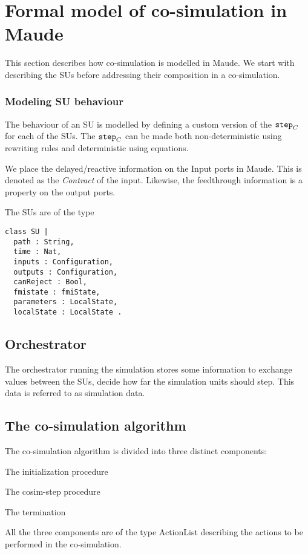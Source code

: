 \section{Formal model of co-simulation in Maude}
This section describes how co-simulation is modelled in Maude.
We start with describing the SUs before addressing their composition in a co-simulation.


\subsubsection{Modeling SU behaviour}
The behaviour of an SU is modelled by defining a custom version of the $\mathtt{step}_{C}$ for each of the SUs. 
The $\mathtt{step}_{C}$ can be made both non-deterministic using rewriting rules and deterministic using equations.


We place the delayed/reactive information on the Input ports in Maude. This is denoted as the \textit{Contract} of the input.
Likewise, the feedthrough information is a property on the output ports.  

The SUs are of the type 
\begin{lstlisting}
class SU |
  path : String, 
  time : Nat, 
  inputs : Configuration, 
  outputs : Configuration,
  canReject : Bool, 
  fmistate : fmiState,
  parameters : LocalState,
  localState : LocalState .
\end{lstlisting}




\subsection{Orchestrator}
The orchestrator running the simulation stores some information to exchange values between the SUs, decide how far the simulation units should step.
This data is referred to as simulation data.

\subsection{The co-simulation algorithm}
The co-simulation algorithm is divided into three distinct components: 
\begin{compactitem}
  \item The initialization procedure
  \item The cosim-step procedure 
  \item The termination
\end{compactitem}
All the three components are of the type ActionList describing the actions to be performed in the co-simulation.
